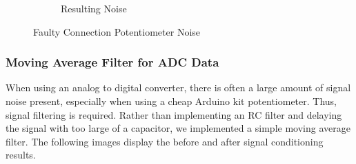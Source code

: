 \documentclass[12pt]{article}
\begin{document}
\begin{figure}[H]
\begin{subfigure}{.4\textwidth}
      \caption{Resulting Noise}
      \label{fig:noise}
    \end{subfigure}
    \caption{Faulty Connection Potentiometer Noise}
    \label{fig:senNoise}
\end{figure}

\subsubsection{Moving Average Filter for ADC Data}
When using an analog to digital converter, there is often a large amount of signal noise present, especially when using a cheap Arduino kit potentiometer. Thus, signal filtering is required. Rather than implementing an RC filter and delaying the signal with too large of a capacitor, we implemented a simple moving average filter. The following images display the before and after signal conditioning results.
\end{document}
